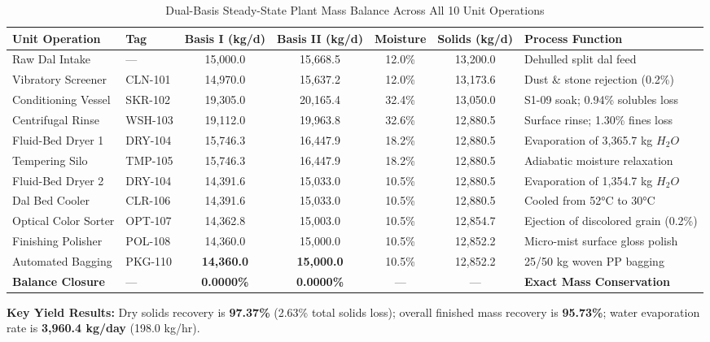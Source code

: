 \documentclass[10pt,a4paper]{article}
\begin{document}
\begin{table}[H]
\centering
\small
\caption{Dual-Basis Steady-State Plant Mass Balance Across All 10 Unit Operations}
\label{tab:dual_mass_balance}
\begin{tabularx}{\linewidth}{llccccX}
\toprule
\textbf{Unit Operation} & \textbf{Tag} & \textbf{Basis I (kg/d)} & \textbf{Basis II (kg/d)} & \textbf{Moisture} & \textbf{Solids (kg/d)} & \textbf{Process Function} \\
\midrule
Raw Dal Intake & --- & 15,000.0 & 15,668.5 & 12.0\% & 13,200.0 & Dehulled split dal feed \\
Vibratory Screener & CLN-101 & 14,970.0 & 15,637.2 & 12.0\% & 13,173.6 & Dust \& stone rejection (0.2\%) \\
Conditioning Vessel & SKR-102 & 19,305.0 & 20,165.4 & 32.4\% & 13,050.0 & S1-09 soak; 0.94\% solubles loss \\
Centrifugal Rinse & WSH-103 & 19,112.0 & 19,963.8 & 32.6\% & 12,880.5 & Surface rinse; 1.30\% fines loss \\
Fluid-Bed Dryer 1 & DRY-104 & 15,746.3 & 16,447.9 & 18.2\% & 12,880.5 & Evaporation of 3,365.7 kg $H_2O$ \\
Tempering Silo & TMP-105 & 15,746.3 & 16,447.9 & 18.2\% & 12,880.5 & Adiabatic moisture relaxation \\
Fluid-Bed Dryer 2 & DRY-104 & 14,391.6 & 15,033.0 & 10.5\% & 12,880.5 & Evaporation of 1,354.7 kg $H_2O$ \\
Dal Bed Cooler & CLR-106 & 14,391.6 & 15,033.0 & 10.5\% & 12,880.5 & Cooled from 52\si{\celsius} to 30\si{\celsius} \\
Optical Color Sorter & OPT-107 & 14,362.8 & 15,003.0 & 10.5\% & 12,854.7 & Ejection of discolored grain (0.2\%) \\
Finishing Polisher & POL-108 & 14,360.0 & 15,000.0 & 10.5\% & 12,852.2 & Micro-mist surface gloss polish \\
Automated Bagging & PKG-110 & \textbf{14,360.0} & \textbf{15,000.0} & 10.5\% & 12,852.2 & 25/50 kg woven PP bagging \\
\midrule
\textbf{Balance Closure} & --- & \textbf{0.0000\%} & \textbf{0.0000\%} & --- & --- & \textbf{Exact Mass Conservation} \\
\bottomrule
\end{tabularx}
\end{table}

\noindent\textbf{Key Yield Results:} Dry solids recovery is \textbf{97.37\%} (2.63\% total solids loss); overall finished mass recovery is \textbf{95.73\%}; water evaporation rate is \textbf{3,960.4 kg/day} (198.0 kg/hr).
\end{document}
